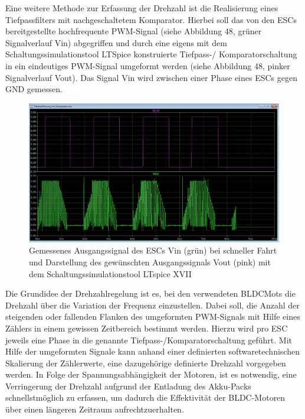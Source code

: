Eine weitere Methode zur Erfassung der Drehzahl ist die Realisierung eines Tiefpassfilters mit nachgeschaltetem Komparator. Hierbei soll das von den \ac{ESC}s bereitgestellte hochfrequente PWM-Signal (siehe Abbildung 48, grüner Signalverlauf Vin) abgegriffen und durch eine eigens mit dem Schaltungssimulationstool LTSpice konstruierte Tiefpass-/ Komparatorschaltung in ein eindeutiges PWM-Signal umgeformt werden (siehe Abbildung 48, pinker Signalverlauf Vout). Das Signal Vin wird zwischen einer Phase eines ESCs gegen GND gemessen.

\begin{figure}[H] %
\includegraphics[width=.99\textwidth]{sec4/images/Signaldarstellung} 
\centering
\captionsetup{width=.95\textwidth}
\caption[Signaldarstellung]{Gemessenes Ausgangssignal des \ac{ESC}s Vin (grün) bei schneller Fahrt und Darstellung des gewünschten Ausgangssignals Vout (pink) mit dem Schaltungssimulationstool LTspice XVII}\centering
\label{fig:Signaldarstellung}
\end{figure}

Die Grundidee der Drehzahlregelung ist es, bei den verwendeten \acp{BLDCMot} die Drehzahl über die Variation der Frequenz einzustellen. Dabei soll, die Anzahl der steigenden oder fallenden Flanken des umgeformten PWM-Signals mit Hilfe eines Zählers in einem gewissen Zeitbereich bestimmt werden. Hierzu wird pro ESC jeweils eine Phase in die genannte Tiefpass-/Komparatorschaltung geführt. Mit Hilfe der umgeformten Signale kann anhand einer definierten softwaretechnischen Skalierung der Zählerwerte, eine dazugehörige definierte Drehzahl vorgegeben werden. In Folge der Spannungsabhängigkeit der Motoren, ist es notwendig, eine Verringerung der Drehzahl aufgrund der Entladung des Akku-Packs schnellstmöglich zu erfassen, um dadurch die Effektivität der BLDC-Motoren über einen längeren Zeitraum aufrechtzuerhalten. \vspace{11pt}


